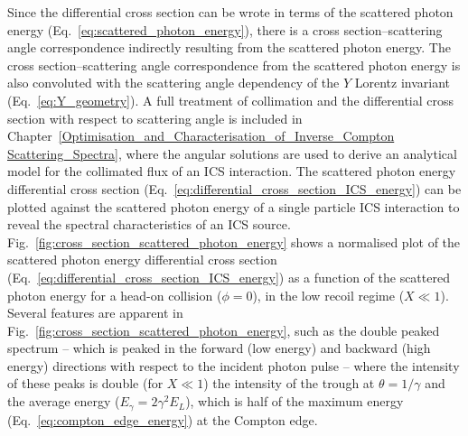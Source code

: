 \documentclass[../main.tex]{subfiles}
\begin{document}
Since the differential cross section can be wrote in terms of the scattered photon energy (Eq.~\ref{eq:scattered_photon_energy}), there is a cross section--scattering angle correspondence indirectly resulting from the scattered photon energy. The cross section--scattering angle correspondence from the scattered photon energy is also convoluted with the scattering angle dependency of the $Y$ Lorentz invariant (Eq.~\ref{eq:Y_geometry}). A full treatment of collimation and the differential cross section with respect to scattering angle is included in Chapter~\ref{Optimisation_and_Characterisation_of_Inverse_Compton Scattering_Spectra}, where the angular solutions are used to derive an analytical model for the collimated flux of an ICS interaction.    
The scattered photon energy differential cross section (Eq.~\ref{eq:differential_cross_section_ICS_energy}) can be plotted against the scattered photon energy of a single particle ICS interaction to reveal the spectral characteristics of an ICS source. Fig.~\ref{fig:cross_section_scattered_photon_energy} shows a normalised plot of the scattered photon energy differential cross section (Eq.~\ref{eq:differential_cross_section_ICS_energy}) as a function of the scattered photon energy for a head-on collision ($\phi=0$), in the low recoil regime ($X \ll 1$). Several features are apparent in Fig.~\ref{fig:cross_section_scattered_photon_energy}, such as the double peaked spectrum -- which is peaked in the forward (low energy) and backward (high energy) directions with respect to the incident photon pulse -- where the intensity of these peaks is double (for $X \ll 1$) the intensity of the trough at $\theta=1/\gamma$ and the average energy ($E_{\gamma} = 2\gamma^{2}E_{L}$), which is half of the maximum energy (Eq.~\ref{eq:compton_edge_energy}) at the Compton edge.   
\end{document}
